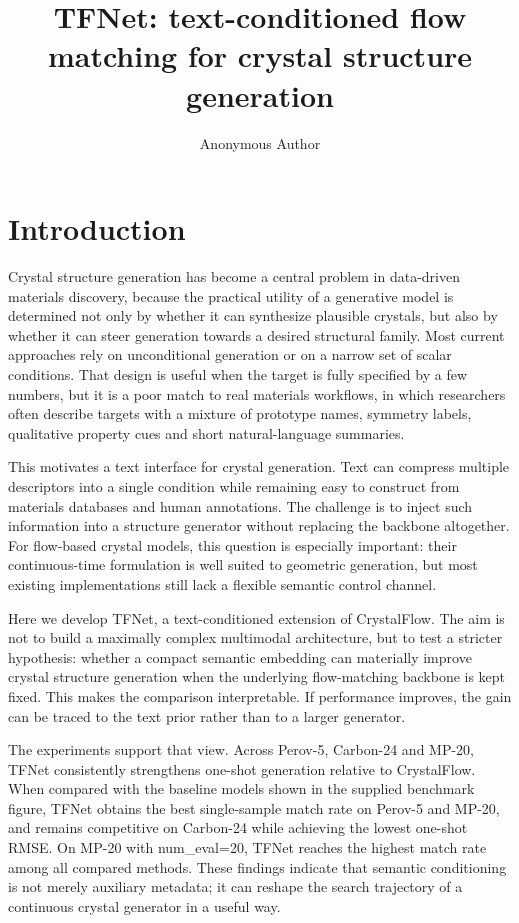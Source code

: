 \documentclass[fleqn,10pt]{wlscirep}
\title{TFNet: text-conditioned flow matching for crystal structure generation}
\author[1,*]{Anonymous Author}
\affil[1]{Affiliation to be added before submission}
\affil[*]{e-mail: to be added at submission}
\begin{document}
\flushbottom
\maketitle
\thispagestyle{empty}

\section*{Introduction}
Crystal structure generation has become a central problem in data-driven materials discovery, because the practical utility of a generative model is determined not only by whether it can synthesize plausible crystals, but also by whether it can steer generation towards a desired structural family. Most current approaches rely on unconditional generation or on a narrow set of scalar conditions. That design is useful when the target is fully specified by a few numbers, but it is a poor match to real materials workflows, in which researchers often describe targets with a mixture of prototype names, symmetry labels, qualitative property cues and short natural-language summaries.

This motivates a text interface for crystal generation. Text can compress multiple descriptors into a single condition while remaining easy to construct from materials databases and human annotations. The challenge is to inject such information into a structure generator without replacing the backbone altogether. For flow-based crystal models, this question is especially important: their continuous-time formulation is well suited to geometric generation, but most existing implementations still lack a flexible semantic control channel.

Here we develop TFNet, a text-conditioned extension of CrystalFlow. The aim is not to build a maximally complex multimodal architecture, but to test a stricter hypothesis: whether a compact semantic embedding can materially improve crystal structure generation when the underlying flow-matching backbone is kept fixed. This makes the comparison interpretable. If performance improves, the gain can be traced to the text prior rather than to a larger generator.

The experiments support that view. Across Perov-5, Carbon-24 and MP-20, TFNet consistently strengthens one-shot generation relative to CrystalFlow. When compared with the baseline models shown in the supplied benchmark figure, TFNet obtains the best single-sample match rate on Perov-5 and MP-20, and remains competitive on Carbon-24 while achieving the lowest one-shot RMSE. On MP-20 with num\_eval=20, TFNet reaches the highest match rate among all compared methods. These findings indicate that semantic conditioning is not merely auxiliary metadata; it can reshape the search trajectory of a continuous crystal generator in a useful way.
\end{document}
